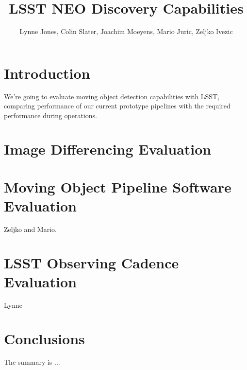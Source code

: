 \documentclass[12pt,preprint]{aastex}
\begin{document}
\title{LSST NEO Discovery Capabilities}

\author{Lynne Jones,  Colin Slater, Joachim Moeyens, Mario Juric, Zeljko Ivezic} %
\affil{}

\begin{abstract}

\end{abstract}

\keywords{}

\section{Introduction}

We're going to evaluate moving object detection capabilities with LSST, comparing performance of our current prototype pipelines with the required performance during operations.


\section{Image Differencing Evaluation}



\section{Moving Object Pipeline Software Evaluation}

Zeljko and Mario.


\section{LSST Observing Cadence Evaluation}

Lynne

\section{Conclusions}

The summary is ...


\end{document}

